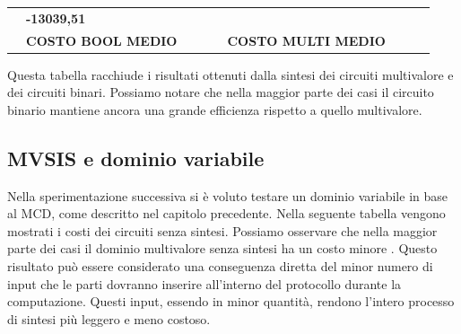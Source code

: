 \documentclass[italian,]{book}
\begin{document}
\begin{longtable}[]{@{}lllllllll@{}}
\begin{minipage}[t]{0.07\columnwidth}
\end{minipage} & \begin{minipage}[t]{0.07\columnwidth}\raggedright
\textbf{-13039,51}\strut
\end{minipage}\tabularnewline
\begin{minipage}[t]{0.07\columnwidth}\raggedright
\strut
\end{minipage} & \begin{minipage}[t]{0.11\columnwidth}\raggedright
\textbf{COSTO BOOL MEDIO}\strut
\end{minipage} & \begin{minipage}[t]{0.08\columnwidth}\raggedright
\strut
\end{minipage} & \begin{minipage}[t]{0.07\columnwidth}\raggedright
\strut
\end{minipage} & \begin{minipage}[t]{0.09\columnwidth}\raggedright
\strut
\end{minipage} & \begin{minipage}[t]{0.12\columnwidth}\raggedright
\textbf{COSTO MULTI MEDIO}\strut
\end{minipage} & \begin{minipage}[t]{0.08\columnwidth}\raggedright
\strut
\end{minipage} & \begin{minipage}[t]{0.07\columnwidth}\raggedright
\strut
\end{minipage} & \begin{minipage}[t]{0.07\columnwidth}\raggedright
\strut
\end{minipage}\tabularnewline
\bottomrule
\end{longtable}

Questa tabella racchiude i risultati ottenuti dalla sintesi dei circuiti multivalore e dei circuiti binari. Possiamo notare che nella maggior parte dei casi il circuito binario mantiene ancora una grande efficienza rispetto a quello multivalore.

\hypertarget{mvsis-e-dominio-variabile}{%
\subsection{MVSIS e dominio variabile}\label{mvsis-e-dominio-variabile}}

Nella sperimentazione successiva si è voluto testare un dominio variabile in base al MCD, come descritto nel capitolo precedente. Nella seguente tabella vengono mostrati i costi dei circuiti senza sintesi. Possiamo osservare che nella maggior parte dei casi il dominio multivalore senza sintesi ha un costo minore . Questo risultato può essere considerato una conseguenza diretta del minor numero di input che le parti dovranno inserire all'interno del protocollo durante la computazione. Questi input, essendo in minor quantità, rendono l'intero processo di sintesi più leggero e meno costoso.
\end{document}
